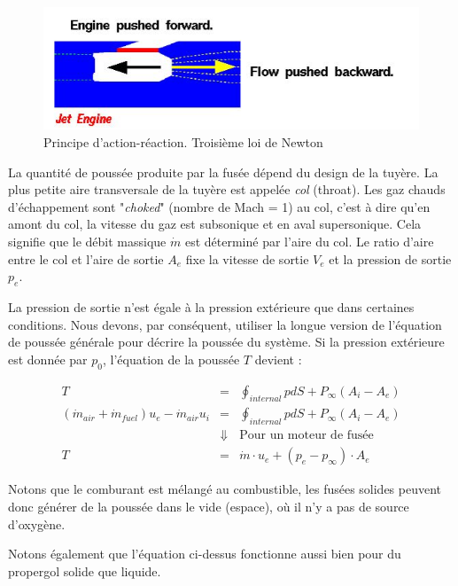 \documentclass{report}
\begin{document}
\begin{figure}[h!]
    \centering
    \includegraphics[scale=0.5]{39.JPG}
    \caption{Principe d'action-réaction. Troisième loi de Newton}
    \label{39}
\end{figure}

La quantité de poussée produite par la fusée dépend du design de la tuyère. La plus petite aire transversale de la tuyère est appelée \textit{col} (throat). Les gaz chauds d'échappement sont "\textit{choked}" (nombre de Mach = 1) au col, c'est à dire qu'en amont du col, la vitesse du gaz est subsonique et en aval supersonique. Cela signifie que le débit massique $\dot{m}$ est déterminé par l'aire du col. Le ratio d'aire entre le col et l'aire de sortie $A_e$ fixe la vitesse de sortie $V_e$ et la pression de sortie $p_e$. 

La pression de sortie n'est égale à la pression extérieure que dans certaines conditions. Nous devons, par conséquent, utiliser la longue version de l'équation de poussée générale pour décrire la poussée du système. Si la pression extérieure est donnée par $p_0$, l'équation de la poussée $T$ devient :

\begin{eqnarray}
T &= &\oint_{internal}pdS+P_\infty (A_i-A_e)\\
(\dot{m}_{air}+\dot{m}_{fuel})u_e-\dot{m}_{air}u_i &= &\oint_{internal}pdS+P_\infty (A_i-A_e)\\
 & \Downarrow &\text{Pour un moteur de fusée}\\
T &= &\dot{m}\cdot u_e +(p_e-p_\infty)\cdot A_e
\end{eqnarray}

Notons que le comburant est mélangé au combustible, les fusées solides peuvent donc générer de la poussée dans le vide (espace), où il n'y a pas de source d'oxygène. 

Notons également que l'équation ci-dessus fonctionne aussi bien pour du propergol solide que liquide. 
\end{document}
